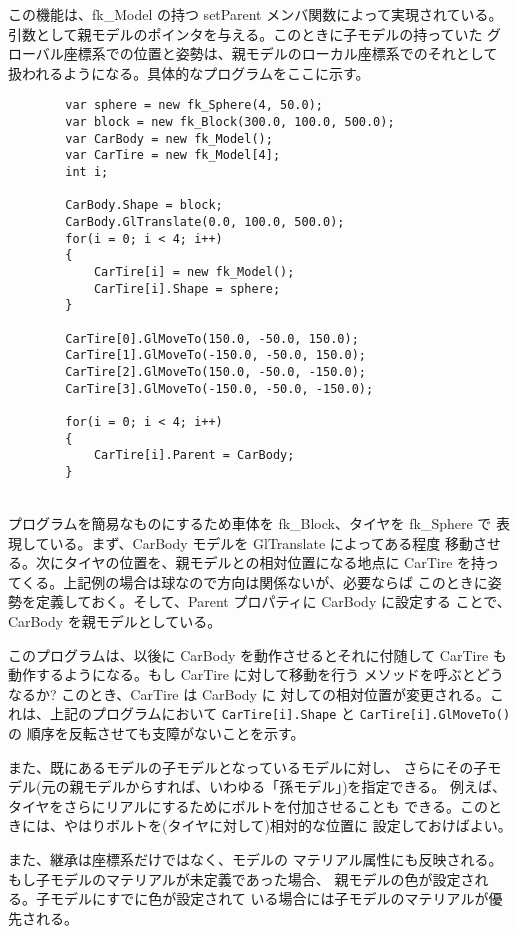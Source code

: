 この機能は、fk\_Model の持つ setParent メンバ関数によって実現されている。
引数として親モデルのポインタを与える。このときに子モデルの持っていた
グローバル座標系での位置と姿勢は、親モデルのローカル座標系でのそれとして
扱われるようになる。具体的なプログラムをここに示す。
\\
\begin{breakbox}
\begin{verbatim}
        var sphere = new fk_Sphere(4, 50.0);
        var block = new fk_Block(300.0, 100.0, 500.0);
        var CarBody = new fk_Model();
        var CarTire = new fk_Model[4];
        int i;

        CarBody.Shape = block;
        CarBody.GlTranslate(0.0, 100.0, 500.0);
        for(i = 0; i < 4; i++)
        {
            CarTire[i] = new fk_Model();
            CarTire[i].Shape = sphere;
        }

        CarTire[0].GlMoveTo(150.0, -50.0, 150.0);
        CarTire[1].GlMoveTo(-150.0, -50.0, 150.0);
        CarTire[2].GlMoveTo(150.0, -50.0, -150.0);
        CarTire[3].GlMoveTo(-150.0, -50.0, -150.0);

        for(i = 0; i < 4; i++)
        {
            CarTire[i].Parent = CarBody;
        }
\end{verbatim}
\end{breakbox}
~ \\
プログラムを簡易なものにするため車体を fk\_Block、タイヤを fk\_Sphere で
表現している。まず、CarBody モデルを GlTranslate によってある程度
移動させる。次にタイヤの位置を、親モデルとの相対位置になる地点に
CarTire を持ってくる。上記例の場合は球なので方向は関係ないが、必要ならば
このときに姿勢を定義しておく。そして、Parent プロパティに CarBody に設定する
ことで、CarBody を親モデルとしている。

このプログラムは、以後に CarBody を動作させるとそれに付随して
CarTire も動作するようになる。もし CarTire に対して移動を行う
メソッドを呼ぶとどうなるか? このとき、CarTire は CarBody に
対しての相対位置が変更される。これは、上記のプログラムにおいて
{\tt CarTire[i].Shape} と {\tt CarTire[i].GlMoveTo()} の
順序を反転させても支障がないことを示す。

また、既にあるモデルの子モデルとなっているモデルに対し、
さらにその子モデル(元の親モデルからすれば、いわゆる「孫モデル」)を指定できる。
例えば、タイヤをさらにリアルにするためにボルトを付加させることも
できる。このときには、やはりボルトを(タイヤに対して)相対的な位置に
設定しておけばよい。

また、継承は座標系だけではなく、モデルの
マテリアル属性にも反映される。もし子モデルのマテリアルが未定義であった場合、
親モデルの色が設定される。子モデルにすでに色が設定されて
いる場合には子モデルのマテリアルが優先される。

